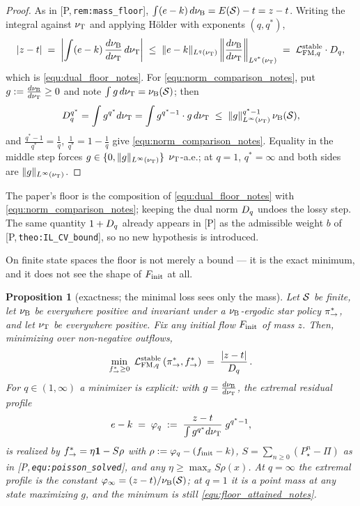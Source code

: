 \documentclass[11pt]{article}
\newtheorem{proposition}[theorem]{Proposition}
\theoremstyle{definition}
\theoremstyle{remark}
\newcommand{\paperref}[1]{[P,\,\texttt{#1}]}   %
\begin{document}
\begin{proof}
As in \paperref{rem:mass\_floor}, $\int(e-k)\,d\nu_{\mathrm{B}}=E(\mathcal S)-t=z-t$. Writing the
integral against $\nu_{\mathrm{T}}$ and applying H\"older with exponents $(q,q^*)$,
\begin{equation*}
    |z-t| \;=\; \left|\int(e-k)\,\frac{d\nu_{\mathrm{B}}}{d\nu_{\mathrm{T}}}\,d\nu_{\mathrm{T}}\right|
    \;\leq\;\|e-k\|_{L^q(\nu_{\mathrm{T}})}\left\|\frac{d\nu_{\mathrm{B}}}{d\nu_{\mathrm{T}}}\right\|_{L^{q^*}(\nu_{\mathrm{T}})}
    \;=\;\mathcal L_{\mathrm{FM},q}^{\mathrm{stable}}\cdot D_{q} ,
\end{equation*}
which is \eqref{equ:dual_floor_notes}. For \eqref{equ:norm_comparison_notes}, put $g:=\frac{d\nu_{\mathrm{B}}}{d\nu_{\mathrm{T}}}\geq0$ and
note $\int g\,d\nu_{\mathrm{T}}=\nu_{\mathrm{B}}(\mathcal S)$; then
\begin{equation*}
    D_{q}^{q^*}=\int g^{q^*}d\nu_{\mathrm{T}}=\int g^{q^*-1}\cdot g\,d\nu_{\mathrm{T}}
    \;\leq\;\|g\|_{L^\infty(\nu_{\mathrm{T}})}^{q^*-1}\,\nu_{\mathrm{B}}(\mathcal S),
\end{equation*}
and $\frac{q^*-1}{q^*}=\frac1q$, $\frac{1}{q^*}=1-\frac1q$ give
\eqref{equ:norm_comparison_notes}. Equality in the middle step forces $g\in\{0,\|g\|_{L^\infty(\nu_{\mathrm{T}})}\}$
$\nu_{\mathrm{T}}$-a.e.; at $q=1$, $q^*=\infty$ and both sides are $\|g\|_{L^\infty(\nu_{\mathrm{T}})}$.
\end{proof}

The paper's floor is the composition of \eqref{equ:dual_floor_notes} with
\eqref{equ:norm_comparison_notes}; keeping the dual norm $D_{q}$ undoes the lossy step. The same
quantity $1+D_{q}$ already appears in [P] as the admissible weight $b$ of
\paperref{theo:IL\_CV\_bound}, so no new hypothesis is introduced.

On finite state spaces the floor is not merely a bound --- it is the exact minimum, and it
does not see the shape of $F_{\mathrm{init}}$ at all.

\begin{proposition}[exactness; the minimal loss sees only the mass]\label{prop:floor_exact_notes}
Let $\mathcal S$ be finite, let $\nu_{\mathrm{B}}$ be everywhere positive and invariant under a
$\nu_{\mathrm{B}}$-ergodic star policy $\pi_{\rightarrow}^*$, and let $\nu_{\mathrm{T}}$ be everywhere
positive. Fix any initial flow $F_{\mathrm{init}}$ of mass $z$. Then, minimizing over non-negative
outflows,
\begin{equation}\label{equ:floor_attained_notes}
    \min_{f^*_{\rightarrow}\geq0}\;\mathcal L_{\mathrm{FM},q}^{\mathrm{stable}}\left(\pi_{\rightarrow}^*,f^*_{\rightarrow}\right)
    \;=\;\frac{|z-t|}{D_{q}}\,.
\end{equation}
For $q\in(1,\infty)$ a minimizer is explicit: with $g=\frac{d\nu_{\mathrm{B}}}{d\nu_{\mathrm{T}}}$, the extremal residual profile
\begin{equation}\label{equ:extremal_profile_notes}
    e-k \;=\; \varphi_q\;:=\;\frac{z-t}{\int g^{q^*}d\nu_{\mathrm{T}}}\;g^{q^*-1},
\end{equation}
is realized by $f^*_{\rightarrow}=\eta\mathbf 1-S\rho$ with $\rho:=\varphi_q-(f_{\mathrm{init}}-k)$,
$S=\sum_{n\geq0}(P_\star^n-\Pi)$ as in \paperref{equ:poisson\_solved}, and any
$\eta\geq\max_x S\rho(x)$. At $q=\infty$ the extremal profile is the constant
$\varphi_\infty=(z-t)/\nu_{\mathrm{B}}(\mathcal S)$; at $q=1$ it is a point mass at any state
maximizing $g$, and the minimum is still \eqref{equ:floor_attained_notes}.
\end{proposition}
\end{document}
